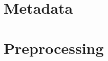 \documentclass[12pt,a4paper]{article}
\begin{document}
\newpage
\section{Metadata}


\newpage
\section{Preprocessing}
\end{document}
